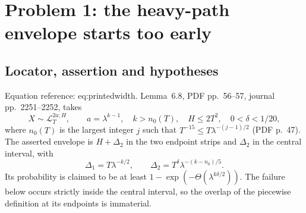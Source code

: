 \documentclass[10pt]{article}
\begin{document}
\section*{Problem 1: the heavy-path envelope starts too early}
\subsection*{Locator, assertion and hypotheses}
Equation reference: eq:printedwidth. Lemma 6.8, PDF pp. 56–57, journal pp. 2251–2252, takes \[X\sim\mathcal L_T^{2a;H},\qquad a=\lambda^{k-1},\quad k>n_0(T),
 \quad H\leq 2T^2,\quad 0<\delta<1/20,\] where \(n_0(T)\) is the largest integer \(j\) such that \(T^{-15}\leq T\lambda^{-(j-1)/2}\) (PDF p. 47). The asserted envelope is \(H+\Delta_2\) in the two endpoint strips and \(\Delta_2\) in the central interval, with \[
 \Delta_1=T\lambda^{-k/2},\qquad
 \Delta_2=T^\delta\lambda^{-(k-n_0)/5}.\] Its probability is claimed to be at least \(1-\exp(-\Theta(\lambda^{k\delta/2}))\). The failure below occurs strictly inside the central interval, so the overlap of the piecewise definition at its endpoints is immaterial.\par
\end{document}
